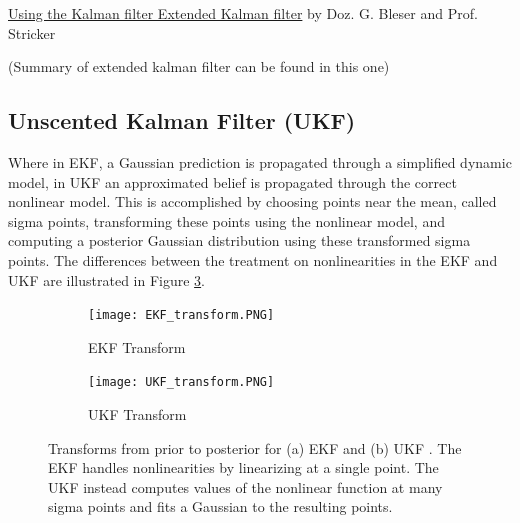 \documentclass[twoside]{article}
\begin{document}
\href{https://ags.cs.uni-kl.de/fileadmin/inf_ags/opt-ss12/lec10_opt.pdf}{Using the Kalman filter
Extended Kalman filter} by Doz. G. Bleser and Prof. Stricker

(Summary of extended kalman filter can be found in this one)




\subsection{Unscented Kalman Filter (UKF)}

Where in EKF, a Gaussian prediction is propagated through a simplified dynamic model, in UKF an approximated belief is propagated through the correct nonlinear model. This is accomplished by choosing points near the mean, called sigma points, transforming these points using the nonlinear model, and computing a posterior Gaussian distribution using these transformed sigma points. The differences between the treatment on nonlinearities in the EKF and UKF are illustrated in Figure \ref{fig:EKF_vs_UKF_transform}.

\begin{figure}[t]
\centering
\begin{subfigure}{.5\textwidth}
  \centering
  \texttt{[image: EKF\_transform.PNG]}
  \caption{EKF Transform}
  \label{fig:EKF_transform}
\end{subfigure}%
\begin{subfigure}{.5\textwidth}
  \centering
  \texttt{[image: UKF\_transform.PNG]}
  \caption{UKF Transform}
  \label{fig:UKF_transform}
\end{subfigure}
\caption{Transforms from prior to posterior for (a) EKF \cite{Xmisc} and (b) UKF \cite{Xmisc}. The EKF handles nonlinearities by linearizing at a single point. The UKF instead computes values of the nonlinear function at many sigma points and fits a Gaussian to the resulting points.}
\label{fig:EKF_vs_UKF_transform}
\end{figure}
\end{document}
